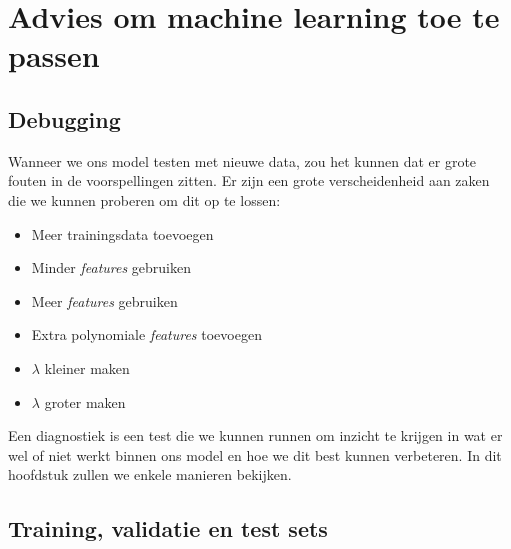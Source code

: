 \section{Advies om machine learning toe te passen}

\subsection{Debugging}

Wanneer we ons model testen met nieuwe data, zou het kunnen dat er grote fouten in de voorspellingen zitten. Er zijn een grote verscheidenheid aan zaken die we kunnen proberen om dit op te lossen:
\begin{itemize}
	\item Meer trainingsdata toevoegen
	\item Minder \textit{features} gebruiken
	\item Meer \textit{features} gebruiken
	\item Extra polynomiale \textit{features} toevoegen
	\item $\lambda$ kleiner maken
	\item $\lambda$ groter maken
\end{itemize}
\noindent
Een diagnostiek is een test die we kunnen runnen om inzicht te krijgen in wat er wel of niet werkt binnen ons model en hoe we dit best kunnen verbeteren. In dit hoofdstuk zullen we enkele manieren bekijken. 

\subsection{Training, validatie en test sets}

